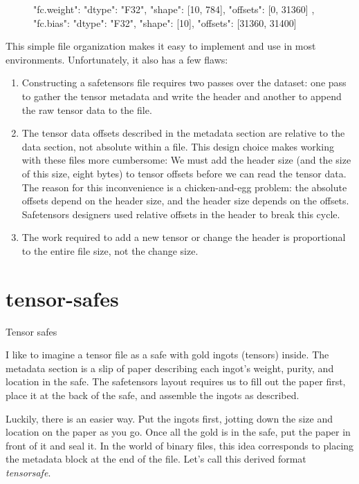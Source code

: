 \documentclass{article}
\begin{document}
\begin{figure}
\begin{code}[json]
{ "fc.weight": {
    "dtype": "F32",
    "shape": [10, 784],
    "offsets": [0, 31360]
  },
  "fc.bias": {
    "dtype": "F32",
    "shape": [10],
    "offsets": [31360, 31400]
  }
}
\end{code}
\end{figure}

This simple file organization makes it easy to implement and use in most environments.
Unfortunately, it also has a few flaws:
\begin{enumerate}
\item
  Constructing a safetensors file requires two passes over the dataset:
  one pass to gather the tensor metadata and write the header
  and another to append the raw tensor data to the file.
\item
  The tensor data offsets described in the metadata section are relative to the data section, not absolute within a file.
  This design choice makes working with these files more cumbersome:
  We must add the header size (and the size of this size, eight bytes) to tensor offsets before we can read the tensor data.
  The reason for this inconvenience is a chicken-and-egg problem:
  the absolute offsets depend on the header size,
  and the header size depends on the offsets.
  Safetensors designers used relative offsets in the header to break this cycle.
\item
  The work required to add a new tensor or change the header is proportional to the entire file size,
  not the change size.
\end{enumerate}

\section{tensor-safes}{Tensor safes}

I like to imagine a tensor file as a safe with gold ingots (tensors) inside.
The metadata section is a slip of paper describing each ingot's weight, purity, and location in the safe.
The safetensors layout requires us to fill out the paper first,
place it at the back of the safe,
and assemble the ingots as described.

Luckily, there is an easier way.
Put the ingots first, jotting down the size and location on the paper as you go.
Once all the gold is in the safe, put the paper in front of it and seal it.
In the world of binary files, this idea corresponds to placing the metadata block at the end of the file.
Let's call this derived format \emph{tensorsafe}.
\end{document}
